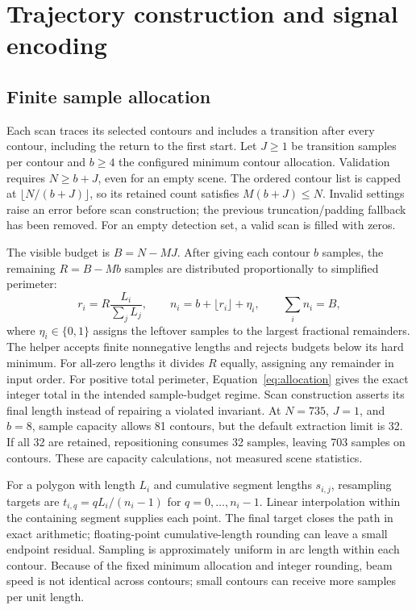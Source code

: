 \documentclass[11pt,a4paper]{article}
\begin{document}
\section{Trajectory construction and signal encoding}
\subsection{Finite sample allocation}
Each scan traces its selected contours and includes a transition after every contour, including the return to the first start. Let $J\geq1$ be transition samples per contour and $b\geq4$ the configured minimum contour allocation. Validation requires $N\geq b+J$, even for an empty scene. The ordered contour list is capped at $\lfloor N/(b+J)\rfloor$, so its retained count satisfies $M(b+J)\leq N$. Invalid settings raise an error before scan construction; the previous truncation/padding fallback has been removed. For an empty detection set, a valid scan is filled with zeros.

The visible budget is $B=N-MJ$. After giving each contour $b$ samples, the remaining $R=B-Mb$ samples are distributed proportionally to simplified perimeter:
\begin{equation}
 r_i=R\frac{L_i}{\sum_j L_j},\qquad
 n_i=b+\lfloor r_i\rfloor+\eta_i,\qquad \sum_i n_i=B,
 \label{eq:allocation}
\end{equation}
where $\eta_i\in\{0,1\}$ assigns the leftover samples to the largest fractional remainders. The helper accepts finite nonnegative lengths and rejects budgets below its hard minimum. For all-zero lengths it divides $R$ equally, assigning any remainder in input order. For positive total perimeter, Equation~\eqref{eq:allocation} gives the exact integer total in the intended sample-budget regime. Scan construction asserts its final length instead of repairing a violated invariant. At $N=735$, $J=1$, and $b=8$, sample capacity allows 81 contours, but the default extraction limit is 32. If all 32 are retained, repositioning consumes 32 samples, leaving 703 samples on contours. These are capacity calculations, not measured scene statistics.

For a polygon with length $L_i$ and cumulative segment lengths $s_{i,j}$, resampling targets are $t_{i,q}=qL_i/(n_i-1)$ for $q=0,\ldots,n_i-1$. Linear interpolation within the containing segment supplies each point. The final target closes the path in exact arithmetic; floating-point cumulative-length rounding can leave a small endpoint residual. Sampling is approximately uniform in arc length within each contour. Because of the fixed minimum allocation and integer rounding, beam speed is not identical across contours; small contours can receive more samples per unit length.
\end{document}
